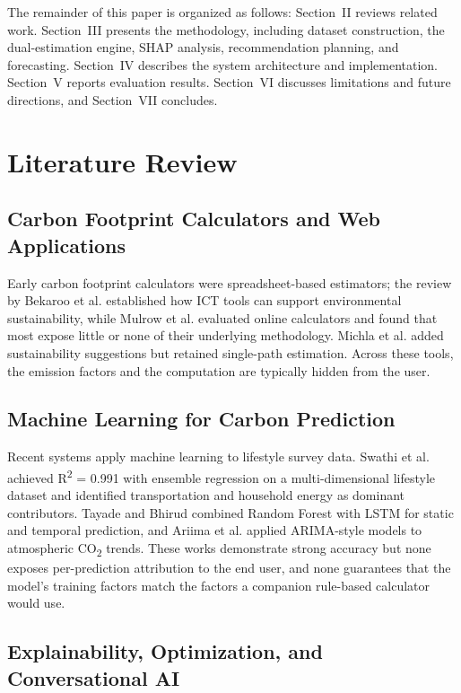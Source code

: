 \documentclass[conference]{IEEEtran}
\begin{document}
The remainder of this paper is organized as follows: Section~II reviews related work. Section~III presents the methodology, including dataset construction, the dual-estimation engine, SHAP analysis, recommendation planning, and forecasting. Section~IV describes the system architecture and implementation. Section~V reports evaluation results. Section~VI discusses limitations and future directions, and Section~VII concludes.

\FloatBarrier

\section{Literature Review}

\subsection{Carbon Footprint Calculators and Web Applications}

Early carbon footprint calculators were spreadsheet-based estimators; the review by Bekaroo et al. \cite{bekaroo2020} established how ICT tools can support environmental sustainability, while Mulrow et al. \cite{mulrow2019} evaluated online calculators and found that most expose little or none of their underlying methodology. Michla et al. \cite{michla2023} added sustainability suggestions but retained single-path estimation. Across these tools, the emission factors and the computation are typically hidden from the user.

\subsection{Machine Learning for Carbon Prediction}

Recent systems apply machine learning to lifestyle survey data. Swathi et al. \cite{swathi2025} achieved R\textsuperscript{2} = 0.991 with ensemble regression on a multi-dimensional lifestyle dataset and identified transportation and household energy as dominant contributors. Tayade and Bhirud \cite{tayade2025} combined Random Forest with LSTM for static and temporal prediction, and Ariima et al. \cite{ariima2024} applied ARIMA-style models to atmospheric CO\textsubscript{2} trends. These works demonstrate strong accuracy but none exposes per-prediction attribution to the end user, and none guarantees that the model's training factors match the factors a companion rule-based calculator would use.

\subsection{Explainability, Optimization, and Conversational AI}
\end{document}
